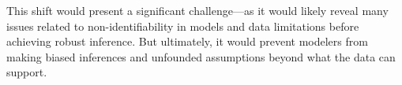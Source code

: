 \documentclass[11pt]{article}
\begin{document}
This shift would present a significant challenge---as it would likely reveal many issues related to non-identifiability in models and data limitations before achieving robust inference. But ultimately, it would prevent modelers from making biased inferences and unfounded assumptions beyond what the data can support.



\clearpage

\end{document}
